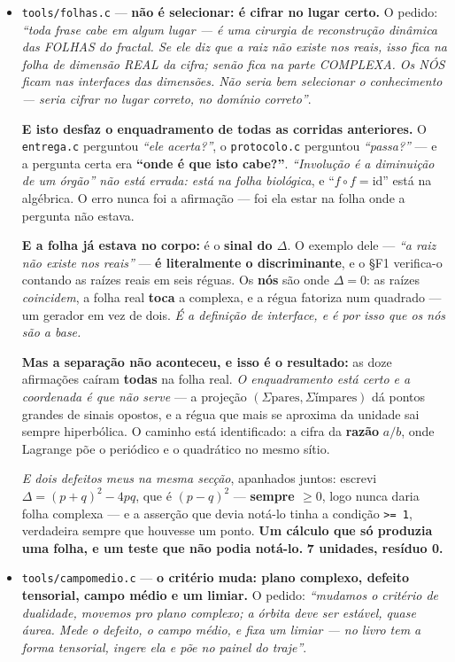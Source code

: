 \documentclass[11pt]{article}
\newcommand{\code}[1]{\texttt{\small #1}}
\theoremstyle{plain}
\theoremstyle{remark}
\begin{document}
\begin{itemize}
\item \code{tools/folhas.c} --- \textbf{não é selecionar: é cifrar no lugar certo.} O pedido: \emph{``toda frase cabe em algum lugar --- é uma cirurgia de reconstrução dinâmica das FOLHAS do
fractal. Se ele diz que a raiz não existe nos reais, isso fica na folha de dimensão REAL da cifra;
senão fica na parte COMPLEXA. Os NÓS ficam nas interfaces das dimensões. Não seria bem selecionar o
conhecimento --- seria cifrar no lugar correto, no domínio correto''}.

\textbf{E isto desfaz o enquadramento de todas as corridas anteriores.} O \code{entrega.c} perguntou
\emph{``ele acerta?''}, o \code{protocolo.c} perguntou \emph{``passa?''} --- e a pergunta certa era
\textbf{``onde é que isto cabe?''}. \emph{``Involução é a diminuição de um órgão'' não está errada:
está na folha biológica}, e ``$f\circ f = \mathrm{id}$'' está na algébrica. O erro nunca foi a
afirmação --- foi ela estar na folha onde a pergunta não estava.

\textbf{E a folha já estava no corpo:} é o \textbf{sinal do $\Delta$}. O exemplo dele --- \emph{``a
raiz não existe nos reais''} --- \textbf{é literalmente o discriminante}, e o §F1 verifica-o
contando as raízes reais em seis réguas. Os \textbf{nós} são onde $\Delta = 0$: as raízes
\emph{coincidem}, a folha real \textbf{toca} a complexa, e a régua fatoriza num quadrado --- um
gerador em vez de dois. \emph{É a definição de interface, e é por isso que os nós são a base.}

\textbf{Mas a separação não aconteceu, e isso é o resultado:} as doze afirmações caíram
\textbf{todas} na folha real. \emph{O enquadramento está certo e a coordenada é que não serve} --- a
projeção $(\Sigma\text{pares}, \Sigma\text{ímpares})$ dá pontos grandes de sinais opostos, e a régua
que mais se aproxima da unidade sai sempre hiperbólica. O caminho está identificado: a cifra da
\textbf{razão} $a/b$, onde Lagrange põe o periódico e o quadrático no mesmo sítio.

\emph{E dois defeitos meus na mesma secção}, apanhados juntos: escrevi $\Delta = (p+q)^2 - 4pq$, que
é $(p-q)^2$ --- \textbf{sempre $\geq 0$}, logo nunca daria folha complexa --- e a asserção que devia
notá-lo tinha a condição \code{>= 1}, verdadeira sempre que houvesse um ponto. \textbf{Um cálculo
que só produzia uma folha, e um teste que não podia notá-lo.} \textbf{7 unidades, resíduo 0.}

\item \code{tools/campomedio.c} --- \textbf{o critério muda: plano complexo, defeito tensorial,
campo médio e um limiar.} O pedido: \emph{``mudamos o critério de dualidade, movemos pro plano
complexo; a órbita deve ser estável, quase áurea. Mede o defeito, o campo médio, e fixa um limiar
--- no livro tem a forma tensorial, ingere ela e põe no painel do traje''}.


\end{itemize}
\end{document}
